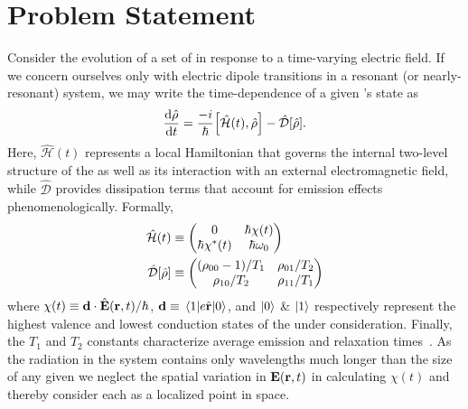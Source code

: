 \section{\label{section:problem statement}Problem Statement}
Consider the evolution of a set of \qds{} in response to a time-varying electric field.
If we concern ourselves only with electric dipole transitions in a resonant (or nearly-resonant) system, we may write the time-dependence of a given \qd's state as
\begin{equation}
  \dv{\hat{\rho}}{t} = \frac{-i}{\hbar}\commutator{\hat{\mathcal{H}}(t)}{\hat{\rho}} - \hat{\mathcal{D}}\qty[\hat{\rho}].
  \label{eq:liouville}
\end{equation}
Here, $\hat{\mathcal{H}}(t)$ represents a local Hamiltonian that governs the internal two-level structure of the \qd{} as well as its interaction with an external electromagnetic field, while $\hat{\mathcal{D}}$ provides dissipation terms that account for emission effects phenomenologically.
Formally,
\begin{subequations}
  \begin{align}
    \hat{\mathcal{H}}(t) &\equiv \mqty(0 & \hbar \chi(t) \\ \hbar \chi^*(t) & \hbar \omega_0) \label{eq:hamiltonian}\\
    \hat{\mathcal{D}}\qty[\hat{\rho}] &\equiv \mqty( \qty(\rho_{00} - 1)/{T_1} & \rho_{01}/{T_2} \\ \rho_{10}/{T_2} & \rho_{11}/T_1 ) \label{eq:dissipator}
  \end{align}
\end{subequations}
where $\chi(t) \equiv \vb{d} \cdot \hat{\vb{E}}(\vb{r}, t)/\hbar$, $\vb{d} \equiv \matrixel{1}{e \hat{\vb{r}}}{0}$, and $\ket{0}$ \& $\ket{1}$ respectively represent the highest valence and lowest conduction states of the \qd{} under consideration.
Finally, the $T_1$ and $T_2$ constants characterize average emission and relaxation times~\cite{}.
As the radiation in the system contains only wavelengths much longer than the size of any given \qd{} we neglect the spatial variation in $\vb{E}(\vb{r}, t)$ in calculating $\chi(t)$ and thereby consider each \qd{} as a localized point in space.


